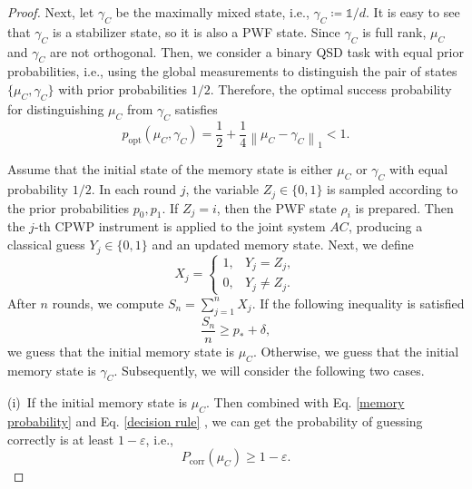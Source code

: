 \documentclass[aps,pra,twocolumn,floatfix,amsfonts,10pt]{revtex4-2}
\begin{document}
\begin{proof}
	Next, let $\gamma_C$ be the maximally mixed state, i.e., $\gamma_C \coloneqq \mathds{1}/d$. 
	It is easy to see that $\gamma_C$ is a stabilizer state, so it is also a PWF state.
	Since $\gamma_C$ is full rank, $\mu_C$ and $\gamma_C$ are not orthogonal.
	Then, we consider a binary QSD task with equal prior probabilities, i.e., using the global measurements to distinguish the pair of states $\{\mu_C, \gamma_C\}$ with prior probabilities $1/2$. 
	Therefore, the optimal success probability for distinguishing $\mu_C$ from $\gamma_C$ satisfies 
	\begin{equation}
		p_{\mathrm{opt}}(\mu_C,\gamma_C)= \frac{1}{2} + \frac{1}{4} \left\|\mu_C-\gamma_C\right\|_1 <1.
	\end{equation}
	
	Assume that the initial state of the memory state is either $\mu_C$ or $\gamma_C$ with equal probability $1/2$. 
	In each round $j$, the variable $Z_j\in\{0,1\}$ is sampled according to the prior probabilities $p_0,p_1$. 
	If $Z_j=i$, then the PWF state $\rho_i$ is prepared. 
	Then the $j$-th CPWP instrument is applied to the joint system $AC$, producing a classical guess $Y_j\in\{0,1\}$ and an updated memory state. 
	Next, we define
	\begin{equation}
		X_j=
		\begin{cases}
			1, & Y_j=Z_j,\\
			0, & Y_j\neq Z_j.
		\end{cases}
	\end{equation}
	After $n$ rounds, we compute $S_n=\sum_{j=1}^{n}X_j$. 
	If the following inequality is satisfied
	\begin{equation}\label{decision rule}
		\frac{S_n}{n}\geqslant p_*+\delta,
	\end{equation}
	we guess that the initial memory state is $\mu_C$.
	Otherwise, we guess that the initial memory state is $\gamma_C$.
	Subsequently, we will consider the following two cases.
	
	(i)~If the initial memory state is $\mu_C$. 
	Then combined with Eq. \eqref{memory probability} and  Eq. \eqref{decision rule} , we can get the probability of guessing correctly is at least $1-\varepsilon$, i.e.,
	\begin{equation}\label{probability mu}
		P_{\mathrm{corr}}(\mu_C)\geqslant 1-\varepsilon.
	\end{equation}
	

\end{proof}
\end{document}

